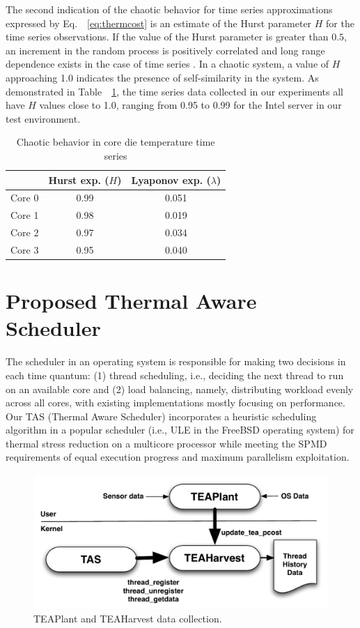 \documentclass[times, 10pt,twocolumn]{IEEEtran}
\newcommand{\equationnames}{Eq.\ }
\begin{document}
The second indication of the chaotic behavior for time series
approximations expressed by \equationnames~\eqref{eq:thermcost} is an
estimate of the Hurst parameter $H$ for the time series observations. If
the value of the Hurst parameter is greater than $0.5$, an increment in
the random process is positively correlated and long range dependence
exists in the case of time series \cite{Sprott2003}.  In a chaotic
system, a value of $H$ approaching 1.0 indicates the presence of
self-similarity in the system.  As demonstrated in
Table~~\ref{tab:chaotic}, the time series data collected in our
experiments all have $H$ values close to 1.0, ranging from 0.95 to 0.99
for the Intel server in our test environment.

\begin{small}
\begin{table}[tbhp]
\caption{Chaotic behavior in core die temperature time series}
\label{tab:chaotic} 
\centering 
\begin{tabular}{lcc}
\hline
\hline
 & Hurst exp. ($H$) & Lyaponov exp. ($\lambda$) \\
\hline
Core 0 & 0.99 & 0.051 \\
Core 1 & 0.98 & 0.019 \\
Core 2 & 0.97 & 0.034 \\
Core 3 & 0.95 & 0.040 \\
\hline
\end{tabular}
\end{table}
\end{small}

\section{Proposed Thermal Aware Scheduler}
\label{sec:sdesign} 
The scheduler in an operating system is responsible for making two
decisions in each time quantum: (1) thread scheduling, i.e., deciding
the next thread to run on an available core and (2) load balancing,
namely, distributing workload evenly across all cores, with existing
implementations mostly focusing on performance.  Our TAS (Thermal Aware
Scheduler) incorporates a heuristic scheduling algorithm in a popular
scheduler (i.e., ULE in the FreeBSD operating system) for thermal stress
reduction on a multicore processor while meeting the SPMD requirements
of equal execution progress and maximum parallelism exploitation.

\begin{figure}[btph] \centering
  \includegraphics[scale=0.45]{tasdesign}
  \caption{TEAPlant and TEAHarvest data collection.}
  \label{fig:teaplant}
\end{figure}
\end{document}
